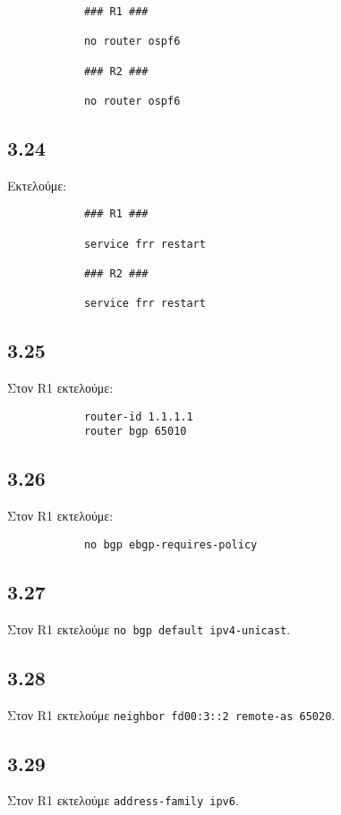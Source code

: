 \documentclass[a4paper, 12pt]{article}
\begin{document}
		\begin{verbatim}
			### R1 ###
			
			no router ospf6
		
			### R2 ###
			
			no router ospf6
		\end{verbatim}

	\subsection*{3.24}
		Εκτελούμε:
		
		\begin{verbatim}
			### R1 ###
			
			service frr restart
			
			### R2 ###
			
			service frr restart
		\end{verbatim}

	\subsection*{3.25}
		Στον R1 εκτελούμε:
		
		\begin{verbatim}
			router-id 1.1.1.1
			router bgp 65010
		\end{verbatim}
		
	\subsection*{3.26}
		Στον R1 εκτελούμε:
		
		\begin{verbatim}
			no bgp ebgp-requires-policy
		\end{verbatim}

	\subsection*{3.27}
		Στον R1 εκτελούμε \verb|no bgp default ipv4-unicast|.

	\subsection*{3.28}
		Στον R1 εκτελούμε \verb|neighbor fd00:3::2 remote-as 65020|.

	\subsection*{3.29}
		Στον R1 εκτελούμε \verb|address-family ipv6|.
\end{document}
